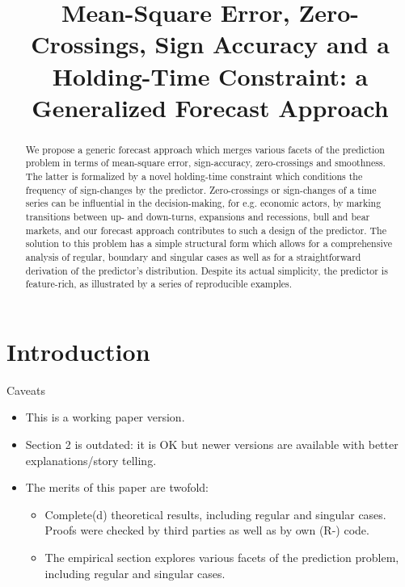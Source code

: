 \documentclass[a4paper]{article}
\title{Mean-Square Error, Zero-Crossings, Sign Accuracy and a Holding-Time Constraint: a Generalized Forecast Approach}
\begin{document}
\maketitle

\begin{abstract}
\noindent 







We propose a  generic forecast approach which merges various facets of the prediction problem in terms of mean-square error, sign-accuracy, zero-crossings and smoothness. The latter is formalized by a novel holding-time constraint which conditions the frequency of sign-changes by the predictor. Zero-crossings or sign-changes of a time series can be influential in the decision-making, for e.g. economic actors, by marking transitions between up- and down-turns, expansions and recessions, bull and bear markets, and our forecast approach contributes to such a design of the predictor. The solution to this problem has a simple structural form which allows for a comprehensive analysis of regular, boundary and singular cases as well as for a straightforward derivation of the predictor's distribution. Despite its actual simplicity, the predictor is feature-rich, as illustrated by a series of reproducible examples.   







\end{abstract}









\section{Introduction}

Caveats
\begin{itemize}
\item This is a working paper version.
\item Section 2 is outdated: it is OK  but newer versions are available with better explanations/story telling.
\item The merits of this paper are twofold: 
\begin{itemize}
\item Complete(d) theoretical results, including regular and singular cases. Proofs were checked by third parties as well as by own (R-) code.  
\item The empirical section explores various facets of the prediction problem, including regular and singular cases.
\end{itemize}
\end{itemize}
\end{document}
